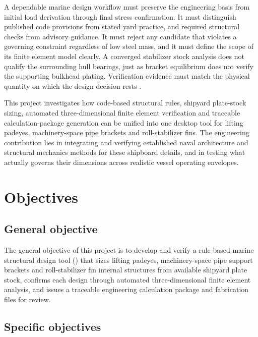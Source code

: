 A dependable marine design workflow must preserve the engineering basis from initial load derivation through final stress confirmation. It must distinguish published code provisions from stated yard practice, and required structural checks from advisory guidance. It must reject any candidate that violates a governing constraint regardless of low steel mass, and it must define the scope of its finite element model clearly. A converged stabilizer stock analysis does not qualify the surrounding hull bearings, just as bracket equilibrium does not verify the supporting bulkhead plating. Verification evidence must match the physical quantity on which the design decision rests \cite{asmeVV10,nasa7009}.

This project investigates how code-based structural rules, shipyard plate-stock sizing, automated three-dimensional finite element verification and traceable calculation-package generation can be unified into one desktop tool for lifting padeyes, machinery-space pipe brackets and roll-stabilizer fins. The engineering contribution lies in integrating and verifying established naval architecture and structural mechanics methods for these shipboard details, and in testing what actually governs their dimensions across realistic vessel operating envelopes.

\section{Objectives}
\label{sec:aim-objectives}

\subsection{General objective}
\label{sec:general-objective}

The general objective of this project is to develop and verify a rule-based marine structural design tool (\NEMO{}) that sizes lifting padeyes, machinery-space pipe support brackets and roll-stabilizer fin internal structures from available shipyard plate stock, confirms each design through automated three-dimensional finite element analysis, and issues a traceable engineering calculation package and fabrication files for review.

\subsection{Specific objectives}
\label{sec:specific-objectives}

